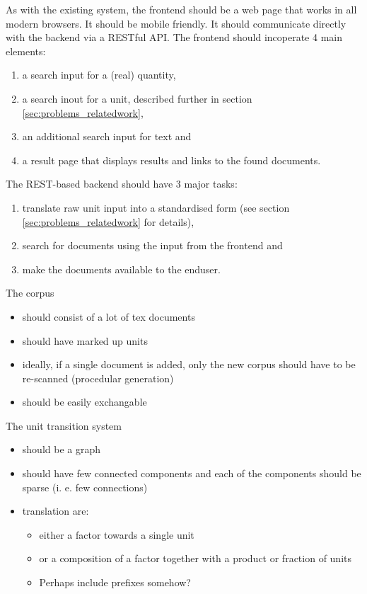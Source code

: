 \documentclass[11pt]{article}
\begin{document}
As with the existing system, the frontend should be a web page that works in all modern browsers. It should be mobile friendly. It should communicate directly with the backend via a RESTful API. The frontend should incoperate 4 main elements:

\begin{enumerate}
  \item a search input for a (real) quantity,
  \item a search inout for a unit, described further in section \ref{sec:problems_relatedwork},
  \item an additional search input for text and
  \item a result page that displays results and links to the found documents.
\end{enumerate}

\noindent The REST-based backend should have 3 major tasks:

\begin{enumerate}
  \item translate raw unit input into a standardised form (see section \ref{sec:problems_relatedwork} for details),
  \item search for documents using the input from the frontend and
  \item make the documents available to the enduser.
\end{enumerate}

\noindent The corpus 
\begin{itemize}
  \item should consist of a lot of tex documents
  \item should have marked up units
  \item ideally, if a single document is added, only the new corpus should have to be re-scanned (procedular generation)
  \item should be easily exchangable
\end{itemize}

The unit transition system 
\begin{itemize}
  \item should be a graph
  \item should have few connected components and each of the components should be sparse (i. e. few connections)
  \item translation are:
  \begin{itemize}
    \item either a factor towards a single unit
    \item or a composition of a factor together with a product or fraction of units 
    \item Perhaps include prefixes somehow?
  \end{itemize}
\end{itemize}
\end{document}
